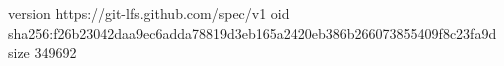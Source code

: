 version https://git-lfs.github.com/spec/v1
oid sha256:f26b23042daa9ec6adda78819d3eb165a2420eb386b266073855409f8c23fa9d
size 349692
